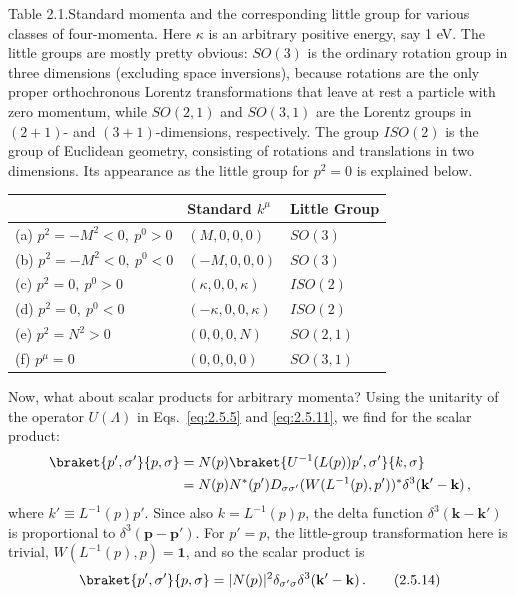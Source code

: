\begin{center}
\begin{minipage}{0.94\textwidth}
\noindent Table 2.1.\quad Standard momenta and the corresponding little group for various
classes of four-momenta. Here $\kappa$ is an arbitrary positive energy, say
1 eV. The little groups are mostly pretty obvious: $SO(3)$ is the ordinary
rotation group in three dimensions (excluding space inversions), because
rotations are the only proper orthochronous Lorentz transformations that leave
at rest a particle with zero momentum, while $SO(2,1)$ and $SO(3,1)$ are the
Lorentz groups in $(2+1)$- and $(3+1)$-dimensions, respectively. The group
$ISO(2)$ is the group of Euclidean geometry, consisting of rotations and
translations in two dimensions. Its appearance as the little group for
$p^2=0$ is explained below.

\medskip
\centering
\renewcommand{\arraystretch}{1.35}
\begin{tabular}{@{}lll@{}}
\hline\hline
 & Standard $k^\mu$ & Little Group \\
\hline
(a) $p^2=-M^2<0,\ p^0>0$ & $(M,0,0,0)$ & $SO(3)$ \\
(b) $p^2=-M^2<0,\ p^0<0$ & $(-M,0,0,0)$ & $SO(3)$ \\
(c) $p^2=0,\ p^0>0$ & $(\kappa,0,0,\kappa)$ & $ISO(2)$ \\
(d) $p^2=0,\ p^0<0$ & $(-\kappa,0,0,\kappa)$ & $ISO(2)$ \\
(e) $p^2=N^2>0$ & $(0,0,0,N)$ & $SO(2,1)$ \\
(f) $p^\mu=0$ & $(0,0,0,0)$ & $SO(3,1)$ \\
\hline\hline
\end{tabular}
\end{minipage}
\end{center}

Now, what about scalar products for arbitrary momenta? Using the unitarity of
the operator $U(\Lambda)$ in Eqs.~\eqref{eq:2.5.5} and \eqref{eq:2.5.11}, we find for the scalar
product:
\[
\begin{aligned}
\braket{p',\sigma'}{p,\sigma}
&=N(p)\braket{U^{-1}(L(p))p',\sigma'}{k,\sigma}\\
&=N(p)N^*(p')
D_{\sigma\sigma'}(W(L^{-1}(p),p'))^*
\delta^3(\mathbf{k}'-\mathbf{k})\,,
\end{aligned}
\]
where $k'\equiv L^{-1}(p)p'$. Since also $k=L^{-1}(p)p$, the delta function
$\delta^3(\mathbf{k}-\mathbf{k}')$ is proportional to
$\delta^3(\mathbf{p}-\mathbf{p}')$. For $p'=p$, the little-group
transformation here is trivial, $W(L^{-1}(p),p)=\mathbf{1}$, and so the scalar product is
\begin{equation}
\braket{p',\sigma'}{p,\sigma}
=|N(p)|^2\delta_{\sigma'\sigma}
\delta^3(\mathbf{k}'-\mathbf{k})\,.
\tag{2.5.14}\label{eq:2.5.14}
\end{equation}

